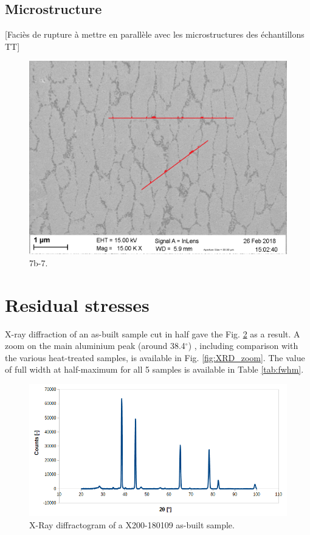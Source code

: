\subsection{Microstructure}
[Faciès de rupture à mettre en parallèle avec les microstructures des échantillons TT]
\begin{figure}[ht]
	\centering
	\centerline{\includegraphics[scale=0.45]{Images/171024-7b_7}}
	\decoRule
	\caption[]{7b-7.}
	\label{fig:result_rs1}
\end{figure}


\section{Residual stresses}

X-ray diffraction of an as-built sample cut in half gave the Fig. \ref{fig:XRD} as a result. A zoom on the main aluminium peak (around 38.4$^\circ$) \cite{Rosenthal14}, including comparison with the various heat-treated samples, is available in Fig. \ref{fig:XRD_zoom}. The value of full width at half-maximum for all 5 samples is available in Table \ref{tab:fwhm}.

\begin{figure}[ht]
	\centering
	\centerline{\includegraphics[scale=0.60]{Images/XRD}}
	\decoRule
	\caption[X-Ray diffractogram of a X200-180109 as-built sample]{X-Ray diffractogram of a X200-180109 as-built sample.}
	\label{fig:XRD}
\end{figure}


